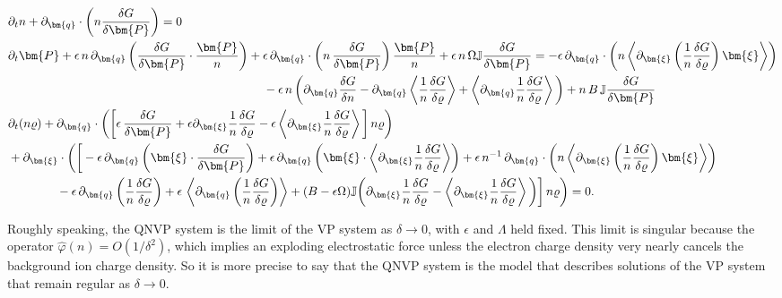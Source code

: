 \documentclass[%
 aip,
 amsmath,amssymb,
reprint, onecolumn %
]{revtex4-1}
\begin{document}
\begin{align}
&\partial_tn +\partial_{\bm{q}}\cdot\left(n\frac{\delta G}{\delta\bm{P}}\right) = 0 \label{ndot_G}\\
&\partial_t\bm{P} + \epsilon\,n\,\partial_{\bm{q}}\left(\frac{\delta G}{\delta\bm{P}}\cdot \frac{\bm{P}}{n}\right) + \epsilon\,\partial_{\bm{q}}\cdot\left(n\,\frac{\delta G}{\delta\bm{P}}\right)\frac{\bm{P}}{n} + \epsilon\,n\,\Omega\mathbb{J}\frac{\delta G}{\delta \bm{P}} =-\epsilon\,\partial_{\bm{q}}\cdot\left(n\left\langle\partial_{\bm{\xi}}\left(\frac{1}{n}\frac{\delta G}{\delta\varrho}\right)\bm{\xi} \right\rangle\right) \nonumber\\
&\hspace*{21em}- \epsilon\,n\,\bigg(\partial_{\bm{q}}\frac{\delta G}{\delta n} - \partial_{\bm{q}}\left\langle \frac{1}{n}\frac{\delta G}{\delta\varrho}\right\rangle + \left\langle\partial_{\bm{q}}\frac{1}{n}\frac{\delta G}{\delta\varrho} \right\rangle\bigg) + n\,B\,\mathbb{J}\frac{\delta G}{\delta\bm{P}} \label{Pdot_G}\\
&\partial_t(n\varrho) + \partial_{\bm{q}}\cdot\bigg(\bigg[\epsilon\,\frac{\delta G}{\delta\bm{P}} +\epsilon\partial_{\bm{\xi}}\frac{1}{n}\frac{\delta G}{\delta\varrho}- \epsilon\left\langle\partial_{\bm{\xi}}\frac{1}{n}\frac{\delta G}{\delta\varrho}\right\rangle\bigg]\,n\varrho\bigg)\nonumber\\
&+ \partial_{\bm{\xi}}\cdot\bigg(\bigg[-\epsilon\,\partial_{\bm{q}}\left(\bm{\xi}\cdot\frac{\delta G}{\delta\bm{P}}\right)+\epsilon\,\partial_{\bm{q}}\left(\bm{\xi}\cdot \left\langle\partial_{\bm{\xi}}\frac{1}{n}\frac{\delta G}{\delta\varrho}\right\rangle\right) + \epsilon\,n^{-1}\,\partial_{\bm{q}}\cdot\left(n\left\langle\partial_{\bm{\xi}}\left(\frac{1}{n}\frac{\delta G}{\delta\varrho}\right)\bm{\xi}\right\rangle\right)\nonumber\\
&\qquad\qquad-\epsilon\,\partial_{\bm{q}}\left(\frac{1}{n}\frac{\delta G}{\delta\varrho}\right) + \epsilon\,\left\langle\partial_{\bm{q}}\left(\frac{1}{n}\frac{\delta G}{\delta\varrho}\right)\right\rangle + (B - \epsilon\Omega)\mathbb{J}\bigg(\partial_{\bm{\xi}}\frac{1}{n}\frac{\delta G}{\delta \varrho} - \left\langle \partial_{\bm{\xi}}\frac{1}{n}\frac{\delta G}{\delta \varrho}\right\rangle\bigg)\bigg]\,n\varrho\bigg) = 0.\label{varrhodot_G}
\end{align}

Roughly speaking, the QNVP system is the limit of the VP system as $\delta\rightarrow 0$, with $\epsilon$ and $\Lambda$ held fixed. This limit is singular because the operator $\widehat{\varphi}(n) = O(1/\delta^2)$, which implies an exploding electrostatic force unless the electron charge density very nearly cancels the background ion charge density. So it is more precise to say that the QNVP system is the model that describes solutions of the VP system that remain regular as $\delta\rightarrow 0$. 
\end{document}
